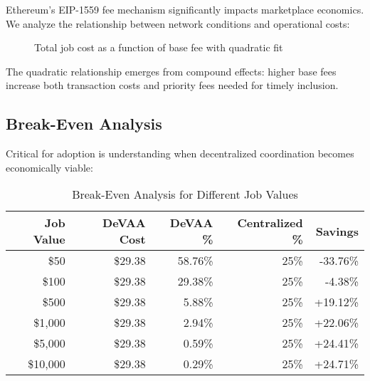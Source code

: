 Ethereum's EIP-1559 fee mechanism significantly impacts marketplace economics. We analyze the relationship between network conditions and operational costs:

\begin{figure}[h]
\centering
{}
\caption{Total job cost as a function of base fee with quadratic fit}
\label{fig:cost-dynamics}
\end{figure}

The quadratic relationship emerges from compound effects: higher base fees increase both transaction costs and priority fees needed for timely inclusion.

\subsection{Break-Even Analysis}

Critical for adoption is understanding when decentralized coordination becomes economically viable:

\begin{table}[h!]
\centering
\caption{Break-Even Analysis for Different Job Values}
\label{tab:breakeven}
\begin{tabular}{rrrrr}
\toprule
\textbf{Job Value} & \textbf{DeVAA Cost} & \textbf{DeVAA \%} & \textbf{Centralized \%} & \textbf{Savings} \\
\midrule
\$50 & \$29.38 & 58.76\% & 25\% & -33.76\% \\
\$100 & \$29.38 & 29.38\% & 25\% & -4.38\% \\
\$500 & \$29.38 & 5.88\% & 25\% & +19.12\% \\
\$1,000 & \$29.38 & 2.94\% & 25\% & +22.06\% \\
\$5,000 & \$29.38 & 0.59\% & 25\% & +24.41\% \\
\$10,000 & \$29.38 & 0.29\% & 25\% & +24.71\% \\
\bottomrule
\end{tabular}
\end{table}


